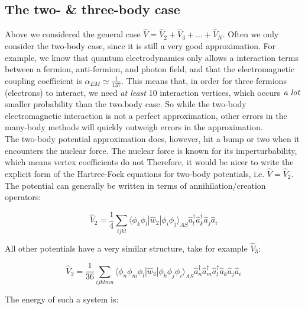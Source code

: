 \documentclass[10pt]{report}
\begin{document}
	\subsection{The two- \& three-body case}
	Above we considered the general case $\hat{V} = \hat{V}_2 + \hat{V}_3 + \ldots + \hat{V}_N$. Often we only consider the two-body case, since it is still a very good approximation. For example, we know that quantum electrodynamics only allows a interaction terms between a fermion, anti-fermion, and photon field, and that the electromagnetic coupling coefficient is $\alpha_{EM} \simeq \frac{1}{137}$. This means that, in order for three fermions (electrons) to interact, we need \emph{at least} 10 interaction vertices, which occurs $\emph{a lot}$ smaller probability than the two.body case. So while the two-body electromagnetic interaction is not a perfect approximation, other errors in the many-body methods will quickly outweigh errors in the approximation.\\
	The two-body potential approximation does, however, hit a bump or two when it encounters the nuclear force. The nuclear force is known for its imperturbability, which means vertex coefficients do not  
	Therefore, it would be nicer to write the explicit form of the Hartree-Fock equations for two-body potentials, i.e. $\hat{V} = \hat{V}_2$. The potential can generally be written in terms of annihilation/creation operators:
	
	\begin{equation}
		\hat{V}_2 = \frac{1}{4}\sum_{ijkl}\langle\phi_k\phi_l|\hat{w}_2|\phi_i\phi_j\rangle_{AS} \hat{a}_l^\dagger\hat{a}_k^\dagger\hat{a}_j\hat{a}_i
	\end{equation}
	
	All other potentials have a very similar structure, take for example $\hat{V}_3$:
	
	\begin{equation}
		\hat{V}_3 = \frac{1}{36}\sum_{ijklmn}\langle\phi_n\phi_m\phi_l|\hat{w}_3|\phi_k\phi_j\phi_i\rangle_{AS} \hat{a}_n^\dagger\hat{a}_m^\dagger\hat{a}_l^\dagger\hat{a}_k \hat{a}_j\hat{a}_i
	\end{equation}
	
	The energy of such a system is:
	
\end{document}
